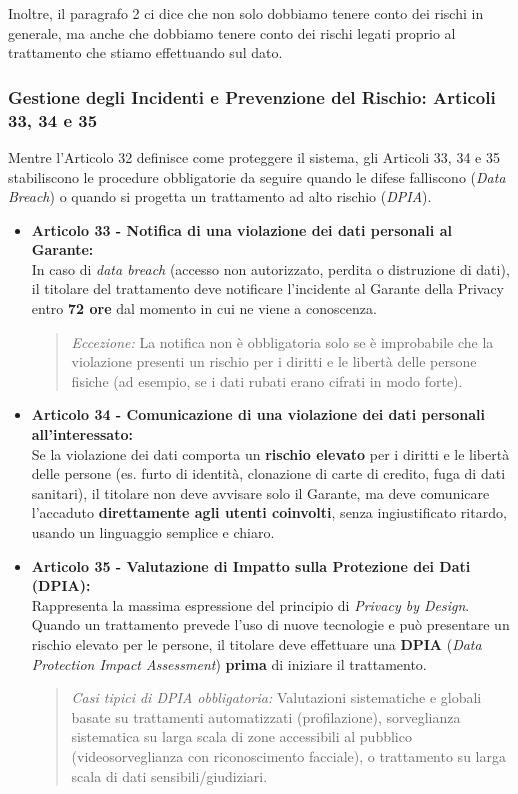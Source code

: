 Inoltre, il paragrafo 2 ci dice che non solo dobbiamo tenere conto dei rischi in generale, ma anche che dobbiamo tenere conto dei rischi legati proprio al trattamento che stiamo effettuando sul dato.
\subsubsection*{Gestione degli Incidenti e Prevenzione del Rischio: Articoli 33, 34 e 35}

Mentre l'Articolo 32 definisce come proteggere il sistema, gli Articoli 33, 34 e 35 stabiliscono le procedure obbligatorie da seguire quando le difese falliscono (\textit{Data Breach}) o quando si progetta un trattamento ad alto rischio (\textit{DPIA}). 

\begin{itemize}
    \item \textbf{Articolo 33 - Notifica di una violazione dei dati personali al Garante:} \\
    In caso di \textit{data breach} (accesso non autorizzato, perdita o distruzione di dati), il titolare del trattamento deve notificare l'incidente al Garante della Privacy entro \textbf{72 ore} dal momento in cui ne viene a conoscenza. 
    \begin{quote}
        \textit{Eccezione:} La notifica non è obbligatoria solo se è improbabile che la violazione presenti un rischio per i diritti e le libertà delle persone fisiche (ad esempio, se i dati rubati erano cifrati in modo forte).
    \end{quote}
    
    \item \textbf{Articolo 34 - Comunicazione di una violazione dei dati personali all'interessato:} \\
    Se la violazione dei dati comporta un \textbf{rischio elevato} per i diritti e le libertà delle persone (es. furto di identità, clonazione di carte di credito, fuga di dati sanitari), il titolare non deve avvisare solo il Garante, ma deve comunicare l'accaduto \textbf{direttamente agli utenti coinvolti}, senza ingiustificato ritardo, usando un linguaggio semplice e chiaro.
    
    \item \textbf{Articolo 35 - Valutazione di Impatto sulla Protezione dei Dati (DPIA):} \\
    Rappresenta la massima espressione del principio di \textit{Privacy by Design}. Quando un trattamento prevede l'uso di nuove tecnologie e può presentare un rischio elevato per le persone, il titolare deve effettuare una \textbf{DPIA} (\textit{Data Protection Impact Assessment}) \textbf{prima} di iniziare il trattamento.
    \begin{quote}
        \textit{Casi tipici di DPIA obbligatoria:} Valutazioni sistematiche e globali basate su trattamenti automatizzati (profilazione), sorveglianza sistematica su larga scala di zone accessibili al pubblico (videosorveglianza con riconoscimento facciale), o trattamento su larga scala di dati sensibili/giudiziari.
    \end{quote}
\end{itemize}

